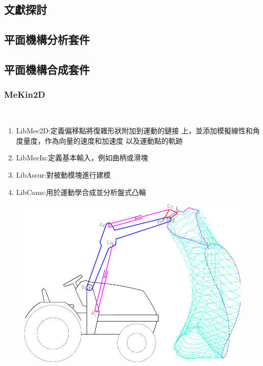\documentclass[14pt,a4paper]{report}  %
\newcommand{\fourteen}{\fontsize{14pt}{\baselineskip}\selectfont}%
\begin{document}
{{\begin{center}
        \chapter{文獻探討}
        \end{center}}
      \section{平面機構分析套件}
      \section{平面機構合成套件}
      \subsection{MeKin2D}
       \hspace*{\fill} \\
       \fourteen {MeKin2D為一種用Free Pascal編寫的子程序包。主要功能使用模組化設計對平面連桿進行運動學模擬、盤式凸輪機構的合成與分析，如圖2.1、圖2.2。其中，MeKin2D的套件包含4個子程式。 分別有:}
       \begin{enumerate} 
       \item LibMec2D:定義偏移點將復雜形狀附加到運動的鏈接			上，並添加模擬線性和角度量度，作為向量的速度和加速度			以及運動點的軌跡
       \item LibMecIn:定義基本輸入，例如曲柄或滑塊
       \item LibAssur:對被動模塊進行建模
       \item LibCams:用於運動學合成並分析盤式凸輪
       \end{enumerate}
       \begin{figure}[H]
        \centering
        \includegraphics[scale=0.4]{平面連桿之運動學模擬.png} 

\end{figure}}
\end{document}
